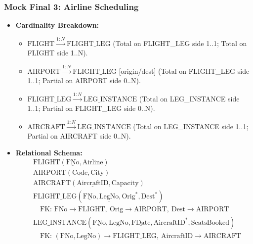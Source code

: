\documentclass[10pt,a4paper]{article}
\begin{document}
\subsubsection*{Mock Final 3: Airline Scheduling}
\begin{itemize}
  \item \textbf{Cardinality Breakdown:}
  \begin{itemize}
    \item $\mathrm{FLIGHT} \xrightarrow{1:N} \mathrm{FLIGHT\_LEG}$ (Total on FLIGHT\_LEG side 1..1; Total on FLIGHT side 1..N).
    \item $\mathrm{AIRPORT} \xrightarrow{1:N} \mathrm{FLIGHT\_LEG}$ [origin/dest] (Total on FLIGHT\_LEG side 1..1; Partial on AIRPORT side 0..N).
    \item $\mathrm{FLIGHT\_LEG} \xrightarrow{1:N} \mathrm{LEG\_INSTANCE}$ (Total on LEG\_INSTANCE side 1..1; Partial on FLIGHT\_LEG side 0..N).
    \item $\mathrm{AIRCRAFT} \xrightarrow{1:N} \mathrm{LEG\_INSTANCE}$ (Total on LEG\_INSTANCE side 1..1; Partial on AIRCRAFT side 0..N).
  \end{itemize}
  \item \textbf{Relational Schema:}
  \begin{align*}
    &\mathrm{FLIGHT}(\underline{\mathrm{FNo}}, \mathrm{Airline})\\
    &\mathrm{AIRPORT}(\underline{\mathrm{Code}}, \mathrm{City})\\
    &\mathrm{AIRCRAFT}(\underline{\mathrm{AircraftID}}, \mathrm{Capacity})\\
    &\mathrm{FLIGHT\_LEG}(\underline{\mathrm{FNo}}, \underline{\mathrm{LegNo}}, \mathrm{Orig}^*, \mathrm{Dest}^*)\\
    &\quad \text{FK: } \mathrm{FNo} \to \mathrm{FLIGHT},\ \mathrm{Orig} \to \mathrm{AIRPORT},\ \mathrm{Dest} \to \mathrm{AIRPORT}\\
    &\mathrm{LEG\_INSTANCE}(\underline{\mathrm{FNo}}, \underline{\mathrm{LegNo}}, \underline{\mathrm{FDate}}, \mathrm{AircraftID}^*, \mathrm{SeatsBooked})\\
    &\quad \text{FK: } (\mathrm{FNo}, \mathrm{LegNo}) \to \mathrm{FLIGHT\_LEG},\ \mathrm{AircraftID} \to \mathrm{AIRCRAFT}
  \end{align*}
\end{itemize}
\end{document}
